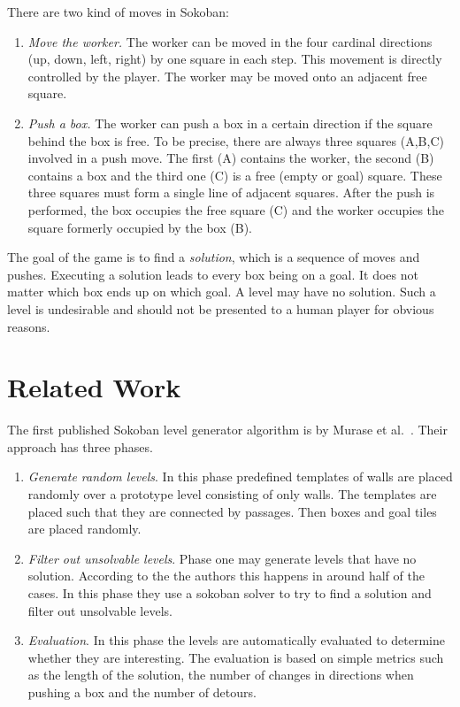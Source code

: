 \documentclass[runningheads]{llncs}
\begin{document}
There are two kind of moves in Sokoban:
\begin{enumerate}
\item \emph{Move the worker.} The worker can be moved in the four cardinal directions (up, down, left, right)
by one square in each step.
This movement is directly controlled by the player. The worker may be moved onto an adjacent free square.
\item \emph{Push a box.} The worker can push a box in a certain direction if the square behind the box is free.
To be precise, there are always three squares (A,B,C) involved in a push move. The first (A) contains the worker, the
second (B) contains a box and the third one (C) is a free (empty or goal) square. 
These three squares must form a single
line of adjacent squares. After the push is performed, the box occupies the free square (C) and the worker occupies
the square formerly occupied by the box (B).
\end{enumerate}

The goal of the game is to find a \emph{solution}, which
is a sequence of moves and pushes. Executing a solution leads to every box
being on a goal. It does not matter which box ends up on which goal.
A level may have no solution. Such a level is undesirable and should not be presented to a human player
for obvious reasons.

\section{Related Work}
The first published Sokoban level generator algorithm is by Murase et al.~\cite{murase1996automatic}.
Their approach has three phases.
\begin{enumerate}
\item \emph{Generate random levels}. In this phase predefined templates of walls are placed randomly
over a prototype level consisting of only walls. 
The templates are placed such that they are connected by passages.
Then boxes and goal tiles are placed randomly.
\item \emph{Filter out unsolvable levels}. Phase one may generate levels that have no solution. According to the the authors this happens in around half of the cases. In this phase they use a sokoban solver to try to find a solution and filter out unsolvable levels.
\item \emph{Evaluation}. In this phase the levels are automatically evaluated to determine whether
they are interesting. The evaluation is based on simple metrics such as the length of the solution, the number of changes in directions when pushing a box and the number of detours.
\end{enumerate}
\end{document}
